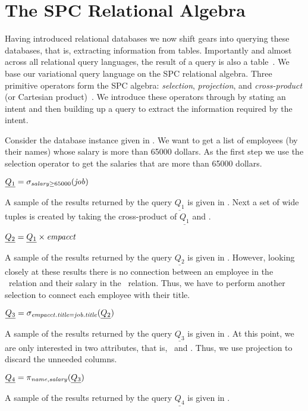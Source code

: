 \section{The SPC Relational Algebra}
\label{sec:ra}


Having introduced relational databases we now shift gears into querying
these databases, that is, extracting information from tables. Importantly
and almost across all relational query languages, the result of a query 
is also a table~\cite{AliceBook}. 
%
We base our variational query language on the SPC relational algebra.
Three primitive operators form the SPC algebra: \emph{selection}, \emph{projection},
and \emph{cross-product} (or Cartesian product)~\cite{AliceBook}.
We introduce these operators through  by stating an intent and then
building up a query to extract the information required by the intent. 

\begin{example}
Consider the database instance given in . We want to get a list
of employees (by their names) whose salary is more than 65000 dollars. 
As the first step we use the selection operator to get the salaries that 
are more than 65000 dollars.\\
%
\centerline{
\ensuremath{
\underline{Q_1} = \sigma_{\salary \ge 65000} (\job)
}}
%
\noindent
A sample of the results returned by the query $\underline{Q_1}$ is given in .
Next a set of wide tuples is created by taking the cross-product of $\underline{Q_1}$
and \empacct.\\
%
\centerline{
\ensuremath{
\underline{Q_2} = \underline{Q_1} \times \empacct
}}
%
\noindent
A sample of the results returned by the query $\underline{Q_2}$ is given in .
However, looking closely at these results there is no connection between an employee
in the \empacct\ relation and their salary in the \job\ relation. Thus, we have to perform 
another selection to connect each employee with their title. \\
%
\centerline{
\ensuremath{
\underline{Q_3} = \sigma_{\empacct.\titleatt=\job.\titleatt} (\underline{Q_2})
}}
%
\noindent
A sample of the results returned by the query $\underline{Q_3}$ is given in .
At this point, we are only interested in two attributes, that is, \name\ and \salary.
Thus, we use projection to discard the unneeded columns.\\
%
\centerline{
\ensuremath{
\underline{Q_4} = \pi_{\name, \salary} (\underline{Q_3} )
}}
%
A sample of the results returned by the query $\underline{Q_4}$ is given in .
\end{example}

